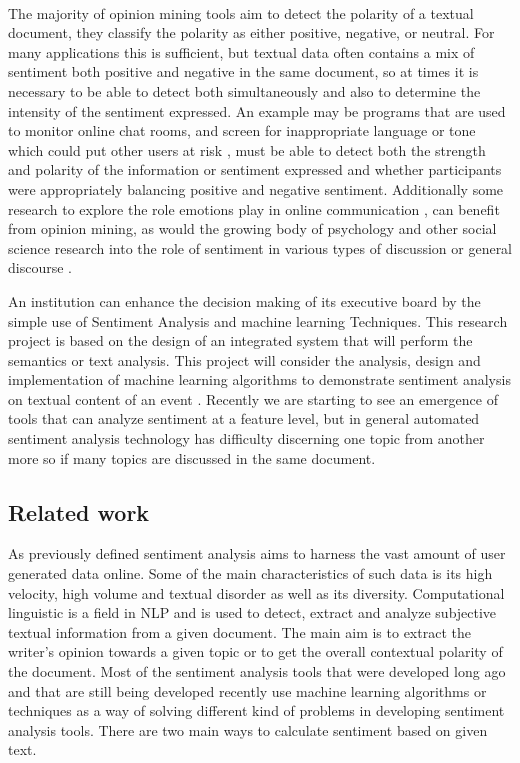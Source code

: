\leavevmode\\
The majority of opinion mining tools aim to detect the polarity of a textual document, they classify the polarity as either positive, negative, or neutral. For many applications this is sufficient, but textual data often contains a mix of sentiment both positive and negative in the same document, so at times it is necessary to be able to detect both simultaneously and also to determine the intensity of the sentiment expressed. An example may be programs that are used to monitor online chat rooms, and screen for inappropriate language or tone which could put other users at risk \cite{ref16}, must be able to detect both the strength and polarity of the information or sentiment expressed and whether participants were appropriately balancing positive and negative sentiment. Additionally some research to explore the role emotions play in online communication \cite{ref17}, can benefit from opinion mining, as would the growing body of psychology and other social science research into the role of sentiment in various types of discussion or general discourse \cite{ref18}.

\clearpage
An institution can enhance the decision making of its executive board by the simple use of Sentiment Analysis and machine learning Techniques. This research project is based on the design of an integrated system that will perform the semantics or text analysis. This project will consider the analysis, design and implementation of machine learning algorithms to demonstrate sentiment analysis on textual content of an event \cite{ref19}.
Recently we are starting to see an emergence of tools that can analyze sentiment at a feature level, but in general automated sentiment analysis technology has difficulty discerning one topic from another more so if many topics are discussed in the same document.
\leavevmode\\


\subsection{Related work}
As previously defined sentiment analysis aims to harness the vast amount of user generated data online. 
Some of the main characteristics of such data is its high velocity, high volume and textual disorder as well as its diversity. 
Computational linguistic is a field in NLP and is used to detect, extract and analyze subjective textual information from a given document. 
The main aim is to extract the writer's opinion towards a given topic or to get the overall contextual polarity of the document.
Most of the sentiment analysis tools that were developed long ago and that are still being developed
recently use machine learning algorithms or techniques as a way of solving different kind of
problems in developing sentiment analysis tools. There are two main ways to calculate sentiment
based on given text.



